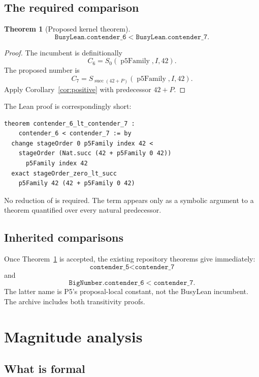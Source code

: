 \documentclass[11pt]{article}
\newtheorem{theorem}{Theorem}[section]
\theoremstyle{definition}
\theoremstyle{remark}
\newcommand{\Idx}{I}
\newcommand{\Pfive}{P}
\newcommand{\lean}[1]{\texttt{\detokenize{#1}}}
\begin{document}
\subsection{The required comparison}

\begin{theorem}[Proposed kernel theorem]\label{thm:main}
\[
 \texttt{BusyLean.contender\_6}
 <\texttt{BusyLean.contender\_7}.
\]
\end{theorem}
\begin{proof}
The incumbent is definitionally
\[
 C_6=S_0(\operatorname{p5Family},\Idx,42).
\]
The proposed number is
\[
 C_7=S_{\operatorname{succ}(42+\Pfive)}
       (\operatorname{p5Family},\Idx,42).
\]
Apply Corollary~\ref{cor:positive} with predecessor \(42+\Pfive\).
\end{proof}

The Lean proof is correspondingly short:
\begin{lstlisting}
theorem contender_6_lt_contender_7 :
    contender_6 < contender_7 := by
  change stageOrder 0 p5Family index 42 <
    stageOrder (Nat.succ (42 + p5Family 0 42))
      p5Family index 42
  exact stageOrder_zero_lt_succ
    p5Family 42 (42 + p5Family 0 42)
\end{lstlisting}
No reduction of \lean{p5Family 0 42} is required.  The term appears only as a
symbolic argument to a theorem quantified over every natural predecessor.

\subsection{Inherited comparisons}

Once Theorem~\ref{thm:main} is accepted, the existing repository theorems give
immediately:
\[
 \texttt{contender\_5}<\texttt{contender\_7}
\]
and
\[
 \texttt{BigNumber.contender\_6}<\texttt{contender\_7}.
\]
The latter name is P5's proposal-local constant, not the BusyLean incumbent.
The archive includes both transitivity proofs.

\section{Magnitude analysis}

\subsection{What is formal}
\end{document}
